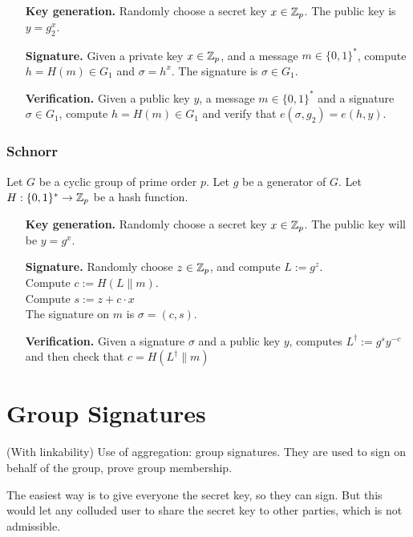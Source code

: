 \begin{itemize}[align = left, leftmargin=*]
	\item[\textbf{Key generation.}] Randomly choose a secret key $x \in {\mathbb Z}_p$. The public key is $y = g_2^x$.
	
	\item[\textbf{Signature.}] Given a private key $x \in {\mathbb Z}_p$, and a message $m \in \{0,1\}^*$, compute $h = H(m) \in G_1$ and $\sigma = h^x$. The signature is $\sigma \in G_1$.
	
	\item[\textbf{Verification.}] Given a public key $y$, a message $m \in \{0,1\}^*$ and a signature $\sigma \in G_1$, compute $h = H(m) \in G_1$ and verify that $e(\sigma,g_2) = e \left( h, y \right)$.
	
\end{itemize}

\subsubsection*{Schnorr}
\cite{Schnorr90}
Let $G$ be a cyclic group of prime order $p$. Let $g$ be a generator of $G$. Let $H : \{0,1\}^\ast \rightarrow {\mathbb Z}_p$ be a hash function.

\begin{itemize}[align = left, leftmargin=*]
	\item[\textbf{Key generation.}]	Randomly choose a secret key $x \in {\mathbb Z}_p$. The public key will be $y = g^x$.
	\item[\textbf{Signature.}] Randomly choose $z \in  {\mathbb Z}_p$, and compute $L := g^z$. \\
Compute $c := H(L \parallel m)$. \\
Compute $s := z + c \cdot x$ \\
The signature on $m$ is $\sigma = (c,s)$.
	\item[\textbf{Verification.}] Given a signature $\sigma$ and a public key $y$, computes $L^{\dagger} := g^{s} y^{-c}$ and then check that $c = H(L^{\dagger} \parallel m) $
\end{itemize}

\section{Group Signatures}
(With linkability)
Use of aggregation: group signatures. They are used to sign on behalf of the group, prove group membership.

The easiest way is to give everyone the secret key, so they can sign. But this would let any colluded user to share the secret key to other parties, which is not admissible.

